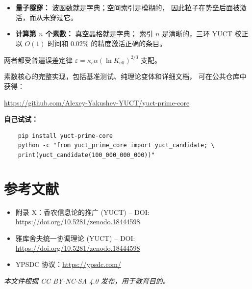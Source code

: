 \documentclass[12pt,a4paper]{article}
\begin{document}
\begin{itemize}
	\item \textbf{量子隧穿：} 波函数就是字典；空间索引是模糊的，
	因此粒子在势垒后面被激活，而从未穿过它。
	\item \textbf{计算第 $n$ 个素数：} 真空晶格就是字典；
	索引 $n$ 是清晰的，三环 YUCT 校正以 $O(1)$ 时间和
	$0.02\%$ 的精度激活正确的条目。
\end{itemize}

两者都受普遍误差定律
$\varepsilon = \kappa_c\alpha(\ln K_{\mathrm{eff}})^{2/3}$ 支配。

素数核心的完整实现，包括基准测试、纯理论变体和详细文档，
可在公共仓库中获得：

\begin{center}
	\url{https://github.com/Alexey-Yakushev-YUCT/yuct-prime-core}
\end{center}

\textbf{自己试试：}
\begin{verbatim}
	pip install yuct-prime-core
	python -c "from yuct_prime_core import yuct_candidate; \
	print(yuct_candidate(100_000_000_000))"
\end{verbatim}

	\section{参考文献}
	
	\begin{itemize}
		\item 附录 X：香农信息论的推广 (YUCT) -- DOI: \url{https://doi.org/10.5281/zenodo.18444598}
		\item 雅库舍夫统一协调理论 (YUCT) -- DOI: \url{https://doi.org/10.5281/zenodo.18444598}
		\item YPSDC 协议：\url{https://ypsdc.com/}
	\end{itemize}
	
	\noindent\textit{本文件根据 CC BY-NC-SA 4.0 发布，用于教育目的。}
	
\end{document}
